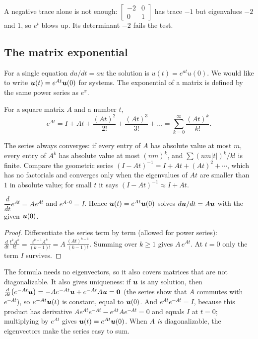 A negative trace alone is not enough: $\left[\begin{smallmatrix} -2&0\\ 0&1\end{smallmatrix}\right]$
has trace $-1$ but eigenvalues $-2$ and $1$, so $e^{t}$ blows up. Its determinant $-2$ fails
the test.

\subsection{The matrix exponential}

For a single equation $du/dt=au$ the solution is $u(t)=e^{at}u(0)$. We would like to write
$\boldsymbol{u}(t)=e^{At}\boldsymbol{u}(0)$ for systems. The exponential of a matrix is defined by the same
power series as $e^{x}$.

\begin{definition}\label{def:u25-exp}
For a square matrix $A$ and a number $t$,
\[
  e^{At}=I+At+\frac{(At)^{2}}{2!}+\frac{(At)^{3}}{3!}+\dots=\sum_{k=0}^{\infty}\frac{(At)^{k}}{k!}.
\]
\end{definition}

The series always converges: if every entry of $A$ has absolute value at most $m$, every entry
of $A^{k}$ has absolute value at most $(nm)^{k}$, and $\sum (nm|t|)^{k}/k!$ is finite. Compare
the geometric series $(I-At)^{-1}=I+At+(At)^{2}+\cdots$, which has no factorials and converges
only when the eigenvalues of $At$ are smaller than $1$ in absolute value; for small $t$ it says
$(I-At)^{-1}\approx I+At$.

\begin{proposition}\label{prop:u25-derivative}
$\dfrac{d}{dt}e^{At}=Ae^{At}$ and $e^{A\cdot0}=I$. Hence $\boldsymbol{u}(t)=e^{At}\boldsymbol{u}(0)$ solves
$d\boldsymbol{u}/dt=A\boldsymbol{u}$ with the given $\boldsymbol{u}(0)$.
\end{proposition}

\begin{proof}
Differentiate the series term by term (allowed for power series):
$\frac{d}{dt}\frac{t^{k}A^{k}}{k!}=\frac{t^{k-1}A^{k}}{(k-1)!}=A\,\frac{(At)^{k-1}}{(k-1)!}$.
Summing over $k\ge1$ gives $A\,e^{At}$. At $t=0$ only the term $I$ survives.
\end{proof}

The formula needs no eigenvectors, so it also covers matrices that are not diagonalizable.
It also gives uniqueness: if $\boldsymbol{u}$ is any solution, then
$\frac{d}{dt}\bigl(e^{-At}\boldsymbol{u}\bigr)=-Ae^{-At}\boldsymbol{u}+e^{-At}A\boldsymbol{u}=\boldsymbol{0}$ (the series show that
$A$ commutes with $e^{-At}$), so $e^{-At}\boldsymbol{u}(t)$ is constant, equal to $\boldsymbol{u}(0)$. And
$e^{At}e^{-At}=I$, because this product has derivative $Ae^{At}e^{-At}-e^{At}Ae^{-At}=0$ and
equals $I$ at $t=0$; multiplying by $e^{At}$ gives $\boldsymbol{u}(t)=e^{At}\boldsymbol{u}(0)$. When $A$ \emph{is} diagonalizable, the
eigenvectors make the series easy to sum.

